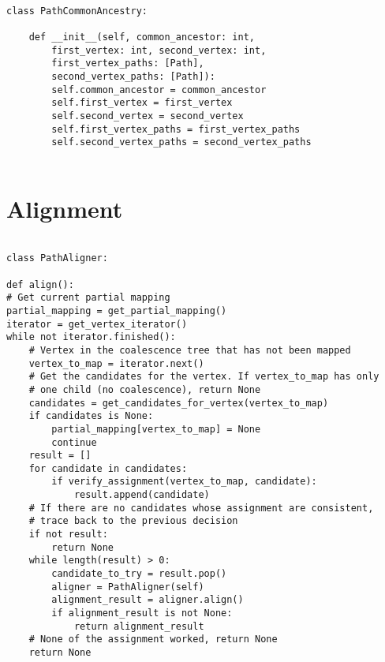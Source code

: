 \documentclass[14pt]{extarticle}
\begin{document}
\begin{lstlisting}

class PathCommonAncestry:
	
	def __init__(self, common_ancestor: int,
		first_vertex: int, second_vertex: int,
		first_vertex_paths: [Path],
		second_vertex_paths: [Path]):
		self.common_ancestor = common_ancestor
		self.first_vertex = first_vertex
		self.second_vertex = second_vertex
		self.first_vertex_paths = first_vertex_paths
		self.second_vertex_paths = second_vertex_paths
	

\end{lstlisting}

\newpage

\section{Alignment}

\vspace*{-\baselineskip}

\begin{lstlisting}

class PathAligner:

def align():
# Get current partial mapping
partial_mapping = get_partial_mapping()
iterator = get_vertex_iterator()
while not iterator.finished():
	# Vertex in the coalescence tree that has not been mapped
	vertex_to_map = iterator.next()
	# Get the candidates for the vertex. If vertex_to_map has only
	# one child (no coalescence), return None
	candidates = get_candidates_for_vertex(vertex_to_map)
	if candidates is None:
		partial_mapping[vertex_to_map] = None
		continue
	result = []
	for candidate in candidates:
		if verify_assignment(vertex_to_map, candidate):
			result.append(candidate)
	# If there are no candidates whose assignment are consistent,
	# trace back to the previous decision
	if not result:
		return None			
	while length(result) > 0:
		candidate_to_try = result.pop()
		aligner = PathAligner(self)
		alignment_result = aligner.align()
		if alignment_result is not None:
			return alignment_result
	# None of the assignment worked, return None
	return None
\end{lstlisting}
\end{document}
